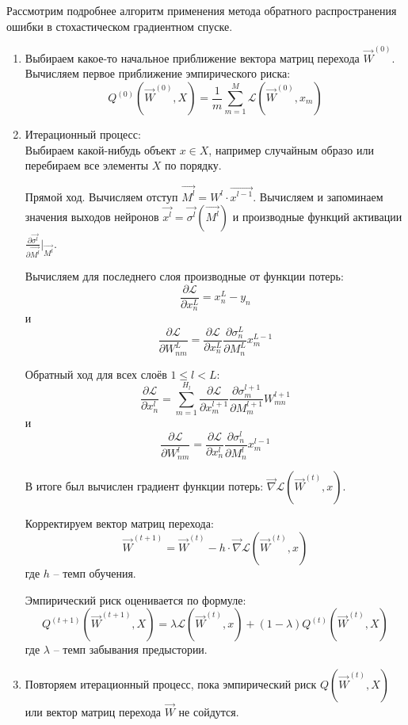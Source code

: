 Рассмотрим подробнее алгоритм применения метода обратного распространения ошибки в стохастическом градиентном спуске.

\begin{enumerate}
	\item Выбираем какое-то начальное приближение вектора матриц перехода $\overrightarrow{W}^{(0)}$. Вычисляем первое приближение эмпирического риска:
	      $$
		      Q^{(0)}(\overrightarrow{W}^{(0)}, X) = \frac{1}{m} \sum\limits_{m = 1}^{M} \mathcal{L} (\overrightarrow{W}^{(0)}, x_m)
	      $$

	\item Итерационный процесс: \\
	      Выбираем какой-нибудь объект $x \in X$, например случайным образо или перебираем все элементы $X$ по порядку.

	      Прямой ход. Вычисляем отступ $\overrightarrow{M^l} = W^l \cdot \overrightarrow{x^{l-1}}$.
	      Вычисляем и запоминаем значения выходов нейронов $\overrightarrow{x^l} = \overrightarrow{\sigma^l}(\overrightarrow{M^l})$ и производные функций активации $\frac{\partial \overrightarrow{\sigma^l}}{\partial \overrightarrow{M^l}}\Big|_{\overrightarrow{M^l}}$.

	      Вычисляем для последнего слоя производные от функции потерь:
	      $$
		      \frac{\partial \mathcal{L}}{\partial x^L_n} = x^L_n - y_n
	      $$
	      и
	      $$
		      \frac{\partial \mathcal{L}}{\partial W^L_{nm}} = \frac{\partial \mathcal{L}}{\partial x^L_n} \frac{\partial \sigma^L_n}{\partial M^L_n} x^{L-1}_{m}
	      $$

	      Обратный ход для всех слоёв $1 \le l < L$:
	      $$
		      \frac{\partial \mathcal{L}}{\partial x^{l}_n} = \sum\limits_{m = 1}^{H_l} \frac{\partial \mathcal{L}}{\partial x^{l+1}_m} \frac{\partial \sigma^{l+1}_m}{\partial M^{l+1}_m} W^{l+1}_{mn}
	      $$
	      и
	      $$
		      \frac{\partial \mathcal{L}}{\partial W^{l}_{nm}} = \frac{\partial \mathcal{L}}{\partial x^{l}_n} \frac{\partial \sigma^{l}_n}{\partial M^{l}_n} x^{l-1}_{m}
	      $$

	      В итоге был вычислен градиент функции потерь: $\overrightarrow{\nabla} \mathcal{L} (\overrightarrow{W}^{(t)}, x)$.

	      Корректируем вектор матриц перехода:
	      $$
		      \overrightarrow{W}^{(t+1)} = \overrightarrow{W}^{(t)} - h \cdot \overrightarrow{\nabla} \mathcal{L} (\overrightarrow{W}^{(t)}, x)
	      $$
	      где $h$ -- темп обучения.

	      Эмпирический риск оценивается по формуле:
	      $$
		      Q^{(t+1)}(\overrightarrow{W}^{(t+1)}, X) = \lambda \mathcal{L} (\overrightarrow{W}^{(t)}, x) + (1-\lambda)  Q^{(t)}(\overrightarrow{W}^{(t)}, X)
	      $$
	      где $\lambda$ -- темп забывания предыстории.

	\item Повторяем итерационный процесс, пока эмпирический риск $Q(\overrightarrow{W}^{(t)}, X)$ или вектор матриц перехода $\overrightarrow{W}$ не сойдутся.
\end{enumerate}


